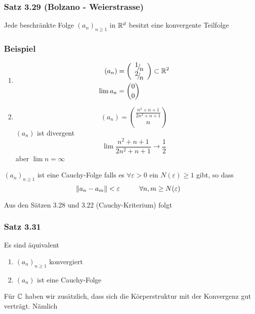 \subsubsection*{Satz 3.29 (Bolzano - Weierstrasse)}
Jede beschränkte Folge $\left( a_n\right)_{n\geq 1}$ in $\mathbb{R}^d$ besitzt eine konvergente Teilfolge
\subsubsection*{Beispiel}
\begin{enumerate}
\item\begin{align*} ({a_n}) &= \left( {\begin{array}{*{20}{c}}
{{\raise0.7ex\hbox{$1$} \!\mathord{\left/
{\vphantom {1 n}}\right.\kern-\nulldelimiterspace}
\!\lower0.7ex\hbox{$n$}}}\\
{{\raise0.7ex\hbox{$2$} \!\mathord{\left/
{\vphantom {2 n}}\right.\kern-\nulldelimiterspace}
\!\lower0.7ex\hbox{$n$}}}
\end{array}} \right) \subset\R^2 \\
\lim{a_n}&={0 \choose 0} \end{align*}
\item \[ ({a_n}) = {\frac{{n^2} + n + 1}{2{n^2} + n + 1} \choose n} \]
$\left( a_n\right)$ ist divergent
\[\lim \frac{{{n^2} + n + 1}}{{2{n^2} + n + 1}} \to \frac{1}{2}\] aber $\lim n=\infty$
\end{enumerate}

\begin{definition}{3.30}
$\left( a_n\right)_{n\geq 1}$ ist eine Cauchy-Folge falls es $\forall\varepsilon >0$ ein $N(\varepsilon)\geq 1$ gibt, so dass
\[\left\| {{a_n} - {a_m}} \right\| < \varepsilon \hspace{10mm}\forall n,m \ge N(\varepsilon )\]
\end{definition}
\noindent Aus den Sätzen 3.28 und 3.22 (Cauchy-Kriterium) folgt
\subsubsection*{Satz 3.31}
Es sind äquivalent
\begin{enumerate}
\item $\left( a_n\right)_{n\geq 1}$ konvergiert
\item $\left( a_n\right)$ ist eine Cauchy-Folge
\end{enumerate}
Für $\mathbb{C}$ haben wir zusätzlich, dass sich die Körperstruktur mit der Konvergenz gut verträgt. Nämlich
